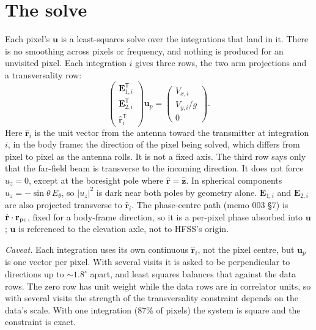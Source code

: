 \documentclass{aastex631}
\newcommand{\vu}{\mathbf{u}}
\newcommand{\vE}{\mathbf{E}}
\newcommand{\rhat}{\hat{\mathbf{r}}}
\begin{document}
\section{The solve} \label{sec:solve}
Each pixel's $\vu$ is a least-squares solve over the integrations that land in it. There is no smoothing across
pixels or frequency, and nothing is produced for an unvisited pixel. Each integration $i$ gives three rows, the
two arm projections and a transversality row:
\begin{equation}
\begin{pmatrix} \vE_{1,i}^{\mathsf T} \\ \vE_{2,i}^{\mathsf T} \\ \rhat_i^{\mathsf T} \end{pmatrix} \vu_p =
\begin{pmatrix} V_{x,i} \\ V_{y,i}/g \\ 0 \end{pmatrix}. \label{eq:solve}
\end{equation}
Here $\rhat_i$ is the unit vector from the antenna toward the transmitter at integration $i$, in the body frame:
the direction of the pixel being solved, which differs from pixel to pixel as the antenna rolls. It is not a
fixed axis. The third row says only that the far-field beam is transverse to the incoming direction. It does not
force $u_z=0$, except at the boresight pole where $\rhat=\hat{\mathbf z}$. In spherical components
$u_z=-\sin\theta\,E_\theta$, so $|u_z|^2$ is dark near both poles by geometry alone. $\vE_{1,i}$ and $\vE_{2,i}$
are also projected transverse to $\rhat_i$. The phase-centre path (memo 003 \S7) is $\rhat\cdot\mathbf r_{\rm pc}$,
fixed for a body-frame direction, so it is a per-pixel phase absorbed into $\vu$; $\vu$ is referenced to the
elevation axle, not to HFSS's origin.

\textit{Caveat.} Each integration uses its own continuous $\rhat_i$, not the pixel centre, but $\vu_p$ is one
vector per pixel. With several visits it is asked to be perpendicular to directions up to $\sim1.8^\circ$ apart,
and least squares balances that against the data rows. The zero row has unit weight while the data rows are in
correlator units, so with several visits the strength of the transversality constraint depends on the data's
scale. With one integration (87\% of pixels) the system is square and the constraint is exact.
\end{document}
